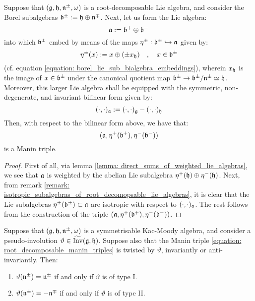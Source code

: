         \begin{lemma} \label{lemma: root_decomposable_lie_bialgebras}
            Suppose that $(\mathfrak{g}, \mathfrak{h}, \mathfrak{n}^{\pm}, \omega)$ is a root-decomposable Lie algebra, and consider the Borel subalgebras $\mathfrak{b}^{\pm} := \mathfrak{h} \oplus \mathfrak{n}^{\mp}$. Next, let us form the Lie algebra:
                $$\mathfrak{a} := \mathfrak{b}^+ \oplus \mathfrak{b}^-$$
            into which $\mathfrak{b}^{\pm}$ embed by means of the maps $\eta^{\pm}: \mathfrak{b}^{\pm} \hookrightarrow \mathfrak{a}$ given by:
                \begin{equation} \label{equation: root_decomposable_borel_subalgebra_embeddings}
                    \eta^{\pm}(x) := x \oplus ( \pm x_{\mathfrak{h}} ) \quad, \quad x \in \mathfrak{b}^{\pm}
                \end{equation}
            (cf. equation \eqref{equation: borel_lie_sub_bialgebra_embeddings}), wherein $x_{\mathfrak{h}}$ is the image of $x \in \mathfrak{b}^{\pm}$ under the canonical quotient map $\mathfrak{b}^{\pm} \to \mathfrak{b}^{\pm}/\mathfrak{n}^{\pm} \simeq \mathfrak{h}$. Moreover, this larger Lie algebra shall be equipped with the symmetric, non-degenerate, and invariant bilinear form given by:
                \begin{equation} \label{equation: extended_root_decomposable_pairings}
                    (\cdot, \cdot)_{\mathfrak{a}} := (\cdot, \cdot)_{\mathfrak{g}} - (\cdot, \cdot)_{\mathfrak{h}}
                \end{equation}
            Then, with respect to the bilinear form above, we have that:
                \begin{equation} \label{equation: root_decomposable_manin_triples}
                    (\mathfrak{a}, \eta^+(\mathfrak{b}^+), \eta^-(\mathfrak{b}^-))
                \end{equation}
            is a Manin triple.
        \end{lemma}
            \begin{proof}
                First of all, via lemma \ref{lemma: direct_sums_of_weighted_lie_algebras}, we see that $\mathfrak{a}$ is weighted by the abelian Lie subalgebra $\eta^+(\mathfrak{h}) \oplus \eta^-(\mathfrak{h})$. Next, from remark \ref{remark: isotropic_subalgebras_of_root_decomopsable_lie_algebras}, it is clear that the Lie subalgebras $\eta^{\pm}(\mathfrak{b}^{\pm}) \subset \mathfrak{a}$ are isotropic with respect to $(\cdot, \cdot)_{\mathfrak{a}}$. The rest follows from the construction of the triple $(\mathfrak{a}, \eta^+(\mathfrak{b}^+), \eta^-(\mathfrak{b}^-))$.
            \end{proof}
        \begin{proposition} \label{prop: twisted_manin_triples_of_types_I_and_II}
            Suppose that $(\mathfrak{g}, \mathfrak{h}, \mathfrak{n}^{\pm}, \omega)$ is a symmetrisable Kac-Moody algebra, and consider a pseudo-involution $\vartheta \in \widetilde{\operatorname{Inv}}(\mathfrak{g}, \mathfrak{h})$. Suppose also that the Manin triple \eqref{equation: root_decomposable_manin_triples} is twisted by $\vartheta$, invariantly or anti-invariantly. Then:
            \begin{enumerate}
                \item $\vartheta(\mathfrak{n}^{\pm}) = \mathfrak{n}^{\pm}$ if and only if $\vartheta$ is of type I.
                \item $\vartheta(\mathfrak{n}^{\pm}) = -\mathfrak{n}^{\mp}$ if and only if $\vartheta$ is of type II.
            \end{enumerate}
        \end{proposition}
